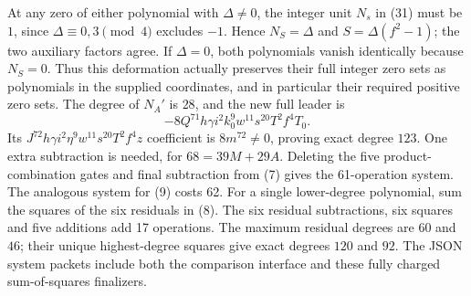 \documentclass[11pt,a4paper]{article}
\theoremstyle{definition}
\theoremstyle{remark}
\begin{document}
At any zero of either polynomial with \(\Delta\ne0\),
the integer unit \(N_s\) in (31) must be \(1\), since
\(\Delta\equiv0,3\pmod4\) excludes \(-1\).
Hence \(N_S=\Delta\) and \(S=\Delta(f^2-1)\);
the two auxiliary factors agree. If \(\Delta=0\), both
polynomials vanish identically because \(N_S=0\).
Thus this deformation actually preserves their full integer zero
sets as polynomials in the supplied coordinates, and in particular
their required positive zero sets.
The degree of \(N_A'\) is \(28\), and the new full leader is
\[
 -8Q^{71}h\gamma i^2k_0^9w^{11}s^{20}T^2f^4T_0. \tag{85}
\]
Its \(J^{72}h\gamma i^2\eta^9w^{11}s^{20}T^2f^4z\)
coefficient is \(8m^{72}\ne0\), proving exact degree \(123\).
One extra subtraction is needed, for \(68=39M+29A\).
Deleting the five product-combination gates and final subtraction
from (7) gives the 61-operation system. The analogous system
for (9) costs 62. For a single lower-degree polynomial, sum the
squares of the six residuals in (8). The six residual
subtractions, six squares and five additions add 17 operations.
The maximum residual degrees are \(60\) and \(46\);
their unique highest-degree squares give exact degrees \(120\)
and \(92\). The JSON system packets include both the comparison
interface and these fully charged sum-of-squares finalizers.
\end{document}
